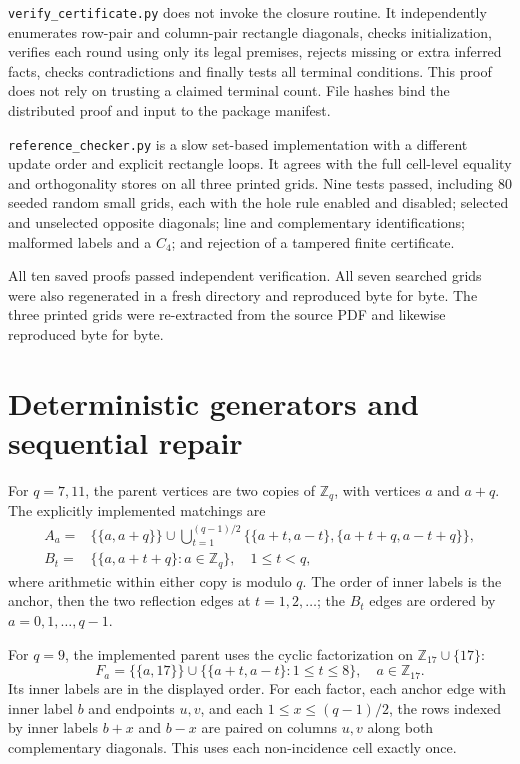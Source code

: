 \documentclass[11pt]{article}
\begin{document}
\texttt{verify\_certificate.py} does not invoke the closure routine. It
independently enumerates row-pair and column-pair rectangle diagonals,
checks initialization, verifies each round using only its legal premises,
rejects missing or extra inferred facts, checks contradictions and finally
tests all terminal conditions. This proof does not rely on trusting a
claimed terminal count. File hashes bind the distributed proof and input
to the package manifest.

\texttt{reference\_checker.py} is a slow set-based implementation with a
different update order and explicit rectangle loops. It agrees with the full
cell-level equality and orthogonality stores on all three printed grids.
Nine tests passed, including 80 seeded random small grids, each with the
hole rule enabled and disabled; selected and unselected opposite diagonals;
line and complementary identifications; malformed labels and a $C_4$;
and rejection of a tampered finite certificate.

All ten saved proofs passed independent verification. All seven searched
grids were also regenerated in a fresh directory and reproduced byte for
byte. The three printed grids were re-extracted from the source PDF and
likewise reproduced byte for byte.

\newpage
\section{Deterministic generators and sequential repair}
For $q=7,11$, the parent vertices are two copies of $\mathbb Z_q$, with
vertices $a$ and $a+q$. The explicitly implemented matchings are
\begin{align*}
 A_a={}&\{\{a,a+q\}\}\cup
 \bigcup_{t=1}^{(q-1)/2}
 \{\{a+t,a-t\},\{a+t+q,a-t+q\}\},\\
 B_t={}&\{\{a,a+t+q\}:a\in\mathbb Z_q\},\quad 1\le t<q,
\end{align*}
where arithmetic within either copy is modulo $q$. The order of inner
labels is the anchor, then the two reflection edges at $t=1,2,\ldots$;
the $B_t$ edges are ordered by $a=0,1,\ldots,q-1$.

For $q=9$, the implemented parent uses the cyclic factorization on
$\mathbb Z_{17}\cup\{17\}$:
\[
 F_a=\{\{a,17\}\}\cup\{\{a+t,a-t\}:1\le t\le8\},\quad a\in\mathbb Z_{17}.
\]
Its inner labels are in the displayed order. For each factor, each anchor
edge with inner label $b$ and endpoints $u,v$, and each
$1\le x\le(q-1)/2$, the rows indexed by inner labels $b+x$ and $b-x$
are paired on columns $u,v$ along both complementary diagonals. This uses
each non-incidence cell exactly once.
\end{document}

